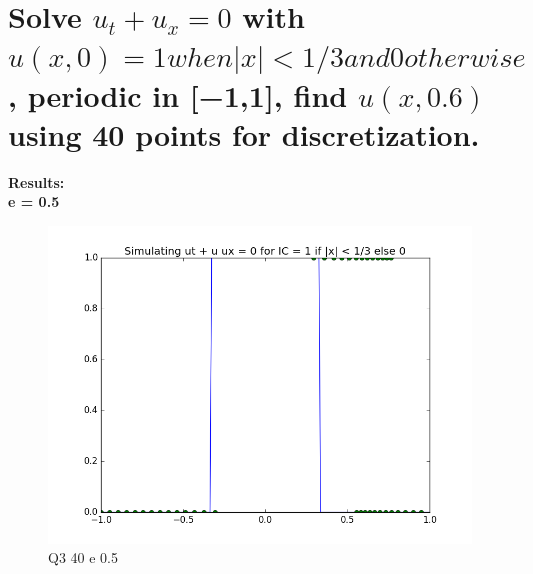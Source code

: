 \documentclass[a4paper,11pt]{article}
\begin{document}
\section{Solve $u_t+u_x=0$ with $u(x,0)= 1 when  |x|<1/3 and 0 otherwise$, periodic in [−1,1], find $u(x,0.6)$ using 40 points for discretization.\\}

\textbf{Results:}\\

\indent \textbf{e = 0.5}
\begin{figure}[ht]
    \centering
    \includegraphics[width=.8\linewidth]{q3_40_05.png}
    \caption{Q3 40 e 0.5}
    \label{fig:ex5}    
\end{figure}
\end{document}
